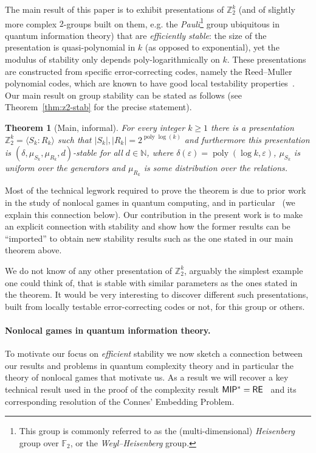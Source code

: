 \documentclass[11pt]{article}
\newtheorem{theorem*}{Theorem}
\theoremstyle{definition}
\newcommand{\field}{\mathbb{F}_2}
\newcommand{\N}{\ensuremath{\mathbb{N}}}
\newcommand{\Z}{\ensuremath{\mathbb{Z}}}
\DeclareMathOperator{\poly}{poly}
\newcommand{\eps}{\varepsilon}
\begin{document}
The main result of this paper is to exhibit presentations of $\Z_2^k$ (and of slightly more complex $2$-groups built on them, e.g. the \emph{Pauli}\footnote{This group is commonly referred to as the (multi-dimensional) \emph{Heisenberg} group over $\field$, or  the \emph{Weyl--Heisenberg} group.} group ubiquitous in quantum information theory) that are \emph{efficiently stable}: the size of the presentation is quasi-polynomial in $k$ (as opposed to exponential), yet the modulus of stability only depends poly-logarithmically on $k$. These presentations are constructed from specific error-correcting codes, namely the Reed--Muller polynomial codes, which are known to have good local testability properties~\cite{babai1991non}. Our main result on group stability can be stated as follows (see Theorem~\ref{thm:z2-stab} for the precise statement).

\begin{theorem*}[Main, informal]\label{thm:main-inf}
For every integer $k\geq 1$ there is a presentation $\Z_2^k = \langle S_k:R_k\rangle$ such that $|S_k|,|R_k| = 2^{\poly\log(k)}$ and furthermore this presentation is $(\delta,\mu_{S_k},\mu_{R_k},d)$-stable for all $d \in \N$, where $\delta(\eps)=\poly(\log k,\eps)$, $\mu_{S_k}$ is uniform over the generators and $\mu_{R_k}$ is some distribution over the relations. 
\end{theorem*}

Most of the technical legwork required to prove the theorem is due to prior work in the study of nonlocal games in quantum computing, and in particular~\cite{ji2020quantum} (we explain this connection below). Our contribution in the present work is to make an explicit connection with stability and show how the former results can be ``imported'' to obtain new stability results such as the one stated in our main theorem above. 

We do not know of any other presentation of $\Z_2^k$, arguably the simplest example one could think of, that is stable with similar parameters as the ones stated in the theorem. It would be very interesting to discover different such presentations, built from locally testable error-correcting codes or not, for this group or others. 

\paragraph{Nonlocal games in quantum information theory.}
To motivate our focus on \emph{efficient} stability we now sketch a connection between our results and problems in quantum complexity theory and in particular the theory of nonlocal games that motivate us. As a result we will recover a key technical result used in the proof of the complexity result $\sf MIP^* = \sf RE$~\cite{ji2020mip} and its corresponding resolution of the Connes' Embedding Problem.
\end{document}
